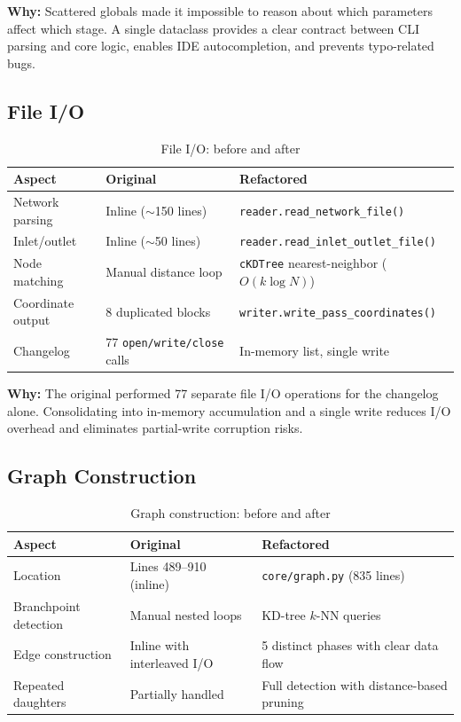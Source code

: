 \documentclass[11pt,a4paper]{article}
\begin{document}
\textbf{Why:} Scattered globals made it impossible to reason about which parameters affect which stage. A single dataclass provides a clear contract between CLI parsing and core logic, enables IDE autocompletion, and prevents typo-related bugs.

\subsection{File I/O}

\begin{table}[H]
\centering
\caption{File I/O: before and after}
\begin{tabularx}{\textwidth}{lXX}
\toprule
\textbf{Aspect} & \textbf{Original} & \textbf{Refactored} \\
\midrule
Network parsing & Inline ($\sim$150 lines) & \texttt{reader.read\_network\_file()} \\
Inlet/outlet & Inline ($\sim$50 lines) & \texttt{reader.read\_inlet\_outlet\_file()} \\
Node matching & Manual distance loop & \texttt{cKDTree} nearest-neighbor ($O(k \log N)$) \\
Coordinate output & 8 duplicated blocks & \texttt{writer.write\_pass\_coordinates()} \\
Changelog & 77 \texttt{open/write/close} calls & In-memory list, single write \\
\bottomrule
\end{tabularx}
\end{table}

\textbf{Why:} The original performed 77 separate file I/O operations for the changelog alone. Consolidating into in-memory accumulation and a single write reduces I/O overhead and eliminates partial-write corruption risks.

\subsection{Graph Construction}

\begin{table}[H]
\centering
\caption{Graph construction: before and after}
\begin{tabularx}{\textwidth}{lXX}
\toprule
\textbf{Aspect} & \textbf{Original} & \textbf{Refactored} \\
\midrule
Location & Lines 489--910 (inline) & \texttt{core/graph.py} (835 lines) \\
Branchpoint detection & Manual nested loops & KD-tree $k$-NN queries \\
Edge construction & Inline with interleaved I/O & 5 distinct phases with clear data flow \\
Repeated daughters & Partially handled & Full detection with distance-based pruning \\
\bottomrule
\end{tabularx}
\end{table}
\end{document}
